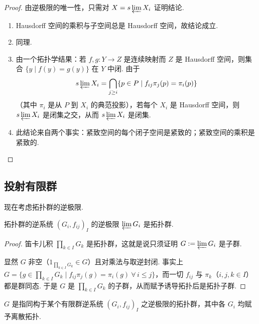 \begin{proof}
由逆极限的唯一性，只需对 $X=s\varprojlim X_i$ 证明结论.
\begin{enumerate}[label=(\arabic*),leftmargin=*]
    \item Hausdorff 空间的乘积与子空间总是 Hausdorff 空间，故结论成立.
    \item 同理.
    \item 由一个拓扑学结果：若 $f,g:Y\to Z$ 是连续映射而 $Z$ 是 Hausdorff 空间，则集合 $\{y\mid f(y)=g(y)\}$ 在 $Y$ 中闭. 由于
    \[
    s\varprojlim X_i=\bigcap_{j\geq i}\{p\in P\mid f_{ij}\pi_j(p)=\pi_i(p)\}
    \]
    （其中 $\pi_i$ 是从 $P$ 到 $X_i$ 的典范投影），若每个 $X_i$ 是 Hausdorff 空间，则 $s\varprojlim X_i$ 是闭集之交，从而 $s\varprojlim X_i$ 是闭集.
    \item 此结论来自两个事实：紧致空间的每个闭子空间是紧致的；紧致空间的乘积是紧致的.
\end{enumerate}
\end{proof}

\subsection{投射有限群}

现在考虑拓扑群的逆极限.

\begin{proposition}\label{c3-prop-1-4}
拓扑群的逆系统 $(G_i,f_{ij})_I$ 的逆极限 $\varprojlim G_i$ 是拓扑群.
\end{proposition}

\begin{proof}
笛卡儿积 $\prod_{k\in I}G_k$ 是拓扑群，这就是说只须证明 $G:=\varprojlim G_i$ 是子群.

显然 $G$ 非空（$1_{\prod_{k\in I}G_k}\in G$）且对乘法与取逆封闭. 事实上 $G=\{g\in\prod_{k\in I}G_k\mid f_{ij}\pi_j(g)=\pi_i(g)\ \forall\, i\leq j\}$，而一切 $f_{ij}$ 与 $\pi_k$（$i,j,k\in I$）都是群同态. 于是 $G$ 是 $\prod_{k\in I}G_k$ 的子群，从而赋予诱导拓扑后是拓扑子群.
\end{proof}

\begin{definition}\label{c3-def-1-10}
 $G$ 是指同构于某个有限群逆系统 $(G_i,f_{ij})_I$ 之逆极限的拓扑群，其中各 $G_i$ 均赋予离散拓扑.
\end{definition}

